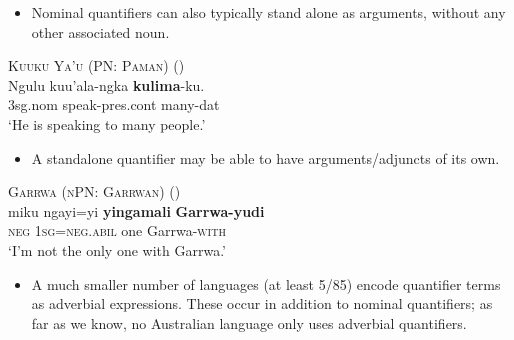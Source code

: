 \documentclass{article}
\makeatletter
\newcommand{\ofy}{/85} %
\makeatother
\begin{document}
\begin{itemize}
\item Nominal quantifiers can also typically stand alone as arguments, without any other associated noun. %
\end{itemize}

\begin{exe}
  \ex \textsc{Kuuku Ya'u (PN: Paman)} (\citealt[15]{thompson88})\\
  \gll Ngulu         kuu'ala-ngka           \textbf{kulima}-ku.\\
  3{\sc sg.nom} speak-{\sc pres.cont} many-{\sc dat}\\
  \glt `He is speaking to many people.'
\end{exe}

\begin{itemize}
\item A standalone quantifier may be able to have arguments/adjuncts of its own.
\end{itemize}
\begin{exe}
  \ex \textsc{Garrwa (nPN: Garrwan)} (\citealt[53]{mushin12})\\
  \gll miku ngayi=yi \textbf{yingamali} \textbf{Garrwa-yudi}\\
  \textsc{neg} 1\textsc{sg}=\textsc{neg.abil} one Garrwa-\textsc{with}\\
  \glt `I'm not the only one with Garrwa.'
\end{exe}

\begin{itemize}
\item A much smaller number of languages (at least 5\ofy) encode quantifier terms as adverbial expressions. These occur in addition to nominal quantifiers; as far as we know, no Australian language only uses adverbial quantifiers.
\end{itemize}
\end{document}
